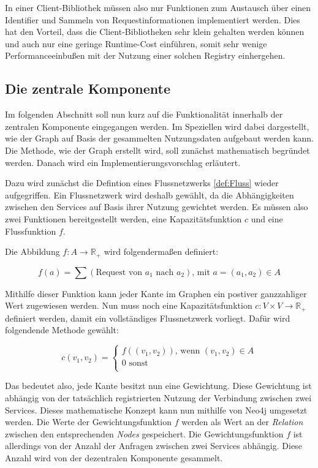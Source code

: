 In einer Client-Bibliothek müssen also nur Funktionen zum Austausch über einen Identifier und Sammeln von Requestinformationen implementiert werden. Dies hat den Vorteil, dass die Client-Bibliotheken sehr klein gehalten werden können und auch nur eine geringe Runtime-Cost einführen, somit sehr wenige Performanceeinbußen mit der Nutzung einer solchen Registry einhergehen.

\subsection{Die zentrale Komponente}

Im folgenden Abschnitt soll nun kurz auf die Funktionalität innerhalb der zentralen Komponente eingegangen werden. Im Speziellen wird dabei dargestellt, wie der Graph auf Basis der gesammelten Nutzungsdaten aufgebaut werden kann. Die Methode, wie der Graph erstellt wird, soll zunächst mathematisch begründet werden. Danach wird ein Implementierungsvorschlag erläutert.

Dazu wird zunächst die Defintion eines Flussnetzwerks \vref{def:Fluss} wieder aufgegriffen. Ein Flussnetzwerk wird deshalb gewählt, da die Abhängigkeiten zwischen den Services auf Basis ihrer Nutzung gewichtet werden. Es müssen also zwei Funktionen bereitgestellt werden, eine Kapazitätsfunktion $c$ und eine Flussfunktion $f$.

Die Abbildung $f: A \rightarrow \mathbb{R_+}$ wird folgendermaßen definiert:

\begin{equation*}
	f(a) = \sum (\text{Request von } a_1 \text{ nach } a_2) \text{, mit } a = (a_1, a_2) \in A
\end{equation*}

Mithilfe dieser Funktion kann jeder Kante im Graphen ein postiver ganzzahliger Wert zugewiesen werden. Nun muss noch eine Kapazitätsfunktion $c: V \times V \rightarrow \mathbb{R_+}$ definiert werden, damit ein vollständiges Flussnetzwerk vorliegt. Dafür wird folgendende Methode gewählt:

\begin{equation*}
	c(v_1,v_2) = \begin{cases}
		f((v_1,v_2)) \text{, wenn } (v_1,v_2) \in A\\
		0 \text{ sonst } \\
	\end{cases}
\end{equation*}

Das bedeutet also, jede Kante besitzt nun eine Gewichtung. Diese Gewichtung ist abhängig von der tatsächlich registrierten Nutzung der Verbindung zwischen zwei Services. Dieses mathematische Konzept kann nun mithilfe von Neo4j umgesetzt werden. Die Werte der Gewichtungsfunktion $f$ werden als Wert an der \textit{Relation} zwischen den entsprechenden \textit{Nodes} gespeichert. Die Gewichtungsfunktion $f$ ist allerdings von der Anzahl der Anfragen zwischen zwei Services abhängig. Diese Anzahl wird von der dezentralen Komponente gesammelt. 

